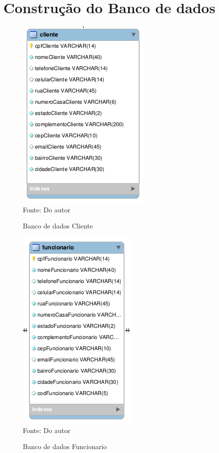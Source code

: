\section{Construção do Banco de dados}


\begin{figure}[H]
	\centering 
	\caption{Banco de dados Cliente}
	\label{banco_de_dados}
	\includegraphics[scale = 0.8]{imagens/bd-cliente.png}
	\\Fonte: Do autor
\end{figure}


\begin{figure}[H]
	\centering 
	\caption{Banco de dados Funcionario}
	\label{banco_de_dados}
	\includegraphics[scale = 0.8]{imagens/bd-func.png}
	\\Fonte: Do autor
\end{figure}

